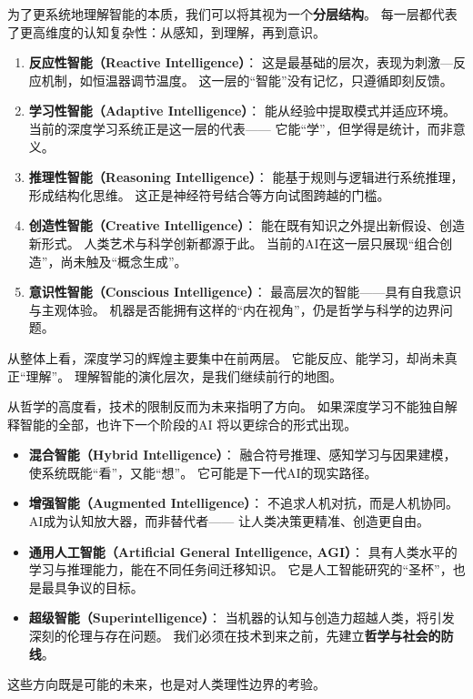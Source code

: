 为了更系统地理解智能的本质，我们可以将其视为一个\textbf{分层结构}。  
每一层都代表了更高维度的认知复杂性：从感知，到理解，再到意识。

\begin{enumerate}
\item \textbf{反应性智能（Reactive Intelligence）}：  
  这是最基础的层次，表现为刺激—反应机制，如恒温器调节温度。  
  这一层的“智能”没有记忆，只遵循即刻反馈。  

\item \textbf{学习性智能（Adaptive Intelligence）}：  
  能从经验中提取模式并适应环境。  
  当前的深度学习系统正是这一层的代表——  
  它能“学”，但学得是统计，而非意义。  

\item \textbf{推理性智能（Reasoning Intelligence）}：  
  能基于规则与逻辑进行系统推理，形成结构化思维。  
  这正是神经符号结合等方向试图跨越的门槛。  

\item \textbf{创造性智能（Creative Intelligence）}：  
  能在既有知识之外提出新假设、创造新形式。  
  人类艺术与科学创新都源于此。  
  当前的AI在这一层只展现“组合创造”，尚未触及“概念生成”。  

\item \textbf{意识性智能（Conscious Intelligence）}：  
  最高层次的智能——具有自我意识与主观体验。  
  机器是否能拥有这样的“内在视角”，仍是哲学与科学的边界问题。  
\end{enumerate}
从整体上看，深度学习的辉煌主要集中在前两层。  
它能反应、能学习，却尚未真正“理解”。  
理解智能的演化层次，是我们继续前行的地图。

从哲学的高度看，技术的限制反而为未来指明了方向。  
如果深度学习不能独自解释智能的全部，也许下一个阶段的AI  
将以更综合的形式出现。

\begin{itemize}
\item \textbf{混合智能（Hybrid Intelligence）}：  
  融合符号推理、感知学习与因果建模，使系统既能“看”，又能“想”。  
  它可能是下一代AI的现实路径。  

\item \textbf{增强智能（Augmented Intelligence）}：  
  不追求人机对抗，而是人机协同。  
  AI成为认知放大器，而非替代者——  
  让人类决策更精准、创造更自由。  

\item \textbf{通用人工智能（Artificial General Intelligence, AGI）}：  
  具有人类水平的学习与推理能力，能在不同任务间迁移知识。  
  它是人工智能研究的“圣杯”，也是最具争议的目标。  

\item \textbf{超级智能（Superintelligence）}：  
  当机器的认知与创造力超越人类，将引发深刻的伦理与存在问题。  
  我们必须在技术到来之前，先建立\textbf{哲学与社会的防线}。  
\end{itemize}
这些方向既是可能的未来，也是对人类理性边界的考验。

